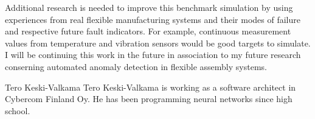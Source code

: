 \documentclass[journal]{IEEEtran}
\begin{document}
Additional research is needed to improve this benchmark simulation by using experiences from real flexible manufacturing systems and their modes of failure
and respective future fault indicators. For example, continuous measurement values from temperature and vibration sensors would be good targets
to simulate.
I will be continuing this work in the future in association to my future research conserning automated anomaly detection
in flexible assembly systems.

\appendices




\begin{IEEEbiography}{Tero Keski-Valkama}
Tero Keski-Valkama is working as a software architect in Cybercom Finland Oy. He has been programming neural networks since high school.
\end{IEEEbiography}
\end{document}

